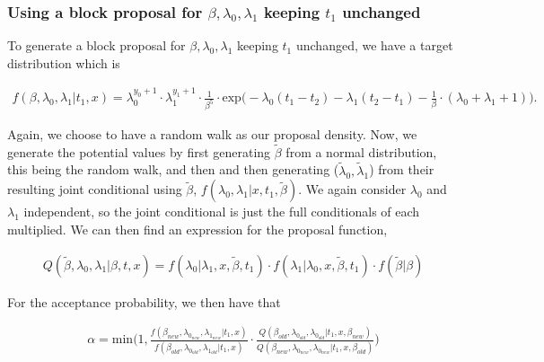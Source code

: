 \subsubsection{Using a block proposal for $\beta, \lambda_0, \lambda_1$ keeping $t_1$ unchanged}

To generate a block proposal for $\beta, \lambda_0, \lambda_1$ keeping $t_1$ unchanged, we have a target distribution which is 


\begin{align}
    f(\beta, \lambda_0, \lambda_1| t_1, x) = 
    \lambda_0^{y_0 + 1} \cdot \lambda_1^{y_1 + 1} \cdot \frac{1}{\beta^5} \cdot \text{exp}\Bigg(  -\lambda_0(t_1 - t_2) 
    - \lambda_1 (t_2 - t_1 ) 
    - \frac{1}{\beta} \cdot (\lambda_0 + \lambda_1  + 1) \Bigg). 
\end{align}


Again, we choose to have a random walk as our proposal density. Now, we generate the potential values by first generating $\widetilde{\beta}$ from a normal distribution, this being the random walk, and then and then generating ($\widetilde{\lambda}_0, \widetilde{\lambda}_1$) from their resulting joint conditional using $\widetilde{\beta}$, $f(\lambda_0, \lambda_1|x,t_1,\widetilde{\beta})$. 
We again consider $\lambda_0$ and $\lambda_1$ independent, so the joint conditional is just the full conditionals of each multiplied. We can then find an expression for the proposal function,

\begin{align}
    Q(\widetilde{\beta}, \lambda_0, \lambda_1| \beta, t, x) = f(\lambda_0| \lambda_1, x, \widetilde{\beta}, t_1)\cdot f(\lambda_1| \lambda_0, x, \widetilde{\beta}, t_1)\cdot f(\widetilde{\beta}| \beta) 
\end{align}




For the acceptance probability, we then have that 

\begin{align}
    \alpha = \text{min} \Bigg(1,  \frac{
    f(\beta_{new}, \lambda_{0_{new}}, \lambda_{1_{new}}|t_1, x)}{f(\beta_{old}, \lambda_{0_{old}}, \lambda_{1_{old}}|t_1, x)}
    \cdot 
    \frac{Q(\beta_{old}, \lambda_{0_{old}}, \lambda_{0_{old}} | t_1, x, \beta_{new})}{Q(\beta_{new}, \lambda_{0_{new}}, \lambda_{0_{new}} | t_1, x, \beta_{old})} \Bigg) %
\end{align}

